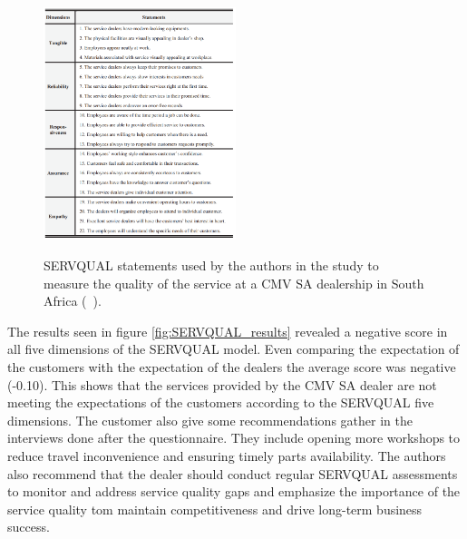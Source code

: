 \begin{figure}[h]
  \caption{SERVQUAL statements used by the authors in the study to measure the quality of the service at a CMV SA dealership in South Africa (~\cite{Measuring_After_sales_Service_Quality}).}
  \centering
  \includegraphics[width=0.50\textwidth]{figs/SERVQUAL_statements}
  \label{fig:SERVQUAL_statements}
\end{figure}


The results seen in figure \ref{fig:SERVQUAL_results} revealed a negative score in all five dimensions of the SERVQUAL model. 
Even comparing the expectation of the customers with the expectation of the dealers the average score was negative (-0.10).
This shows that the services provided by the CMV SA dealer are not meeting the expectations of the customers according to the SERVQUAL five dimensions.
The customer also give some recommendations gather in the interviews done after the questionnaire. 
They include opening more workshops to reduce travel inconvenience and ensuring timely parts availability.
The authors also recommend that the dealer should conduct regular SERVQUAL assessments to monitor and address service quality gaps and emphasize the importance of the service quality tom maintain competitiveness and drive long-term business success. ~\cite{Measuring_After_sales_Service_Quality}


